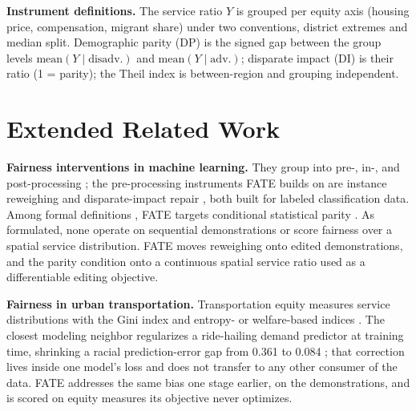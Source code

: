 \textbf{Instrument definitions.} The service ratio $Y$ is grouped
per equity axis (housing price, compensation, migrant share) under two
conventions, district extremes and median split. Demographic parity (DP) is
the signed gap between the group levels
$\mathrm{mean}(Y \mid \mathrm{disadv.})$ and
$\mathrm{mean}(Y \mid \mathrm{adv.})$; disparate impact (DI) is their ratio
(1 = parity); the Theil index is between-region and grouping independent.

\section{Extended Related Work}\label{app:related}

\textbf{Fairness interventions in machine learning.} They group into
pre-, in-, and post-processing \cite{barocas2023}; the pre-processing
instruments FATE builds on are instance reweighing \cite{kamirancalders2012}
and disparate-impact repair \cite{feldman2015}, both built for labeled
classification data. Among formal definitions \cite{vermarubin2018}, FATE
targets conditional statistical parity \cite{corbettdavies2017}. As
formulated, none operate on sequential demonstrations or score fairness
over a spatial service distribution. FATE moves reweighing onto edited
demonstrations, and the parity condition onto a continuous spatial service
ratio used as a differentiable editing objective.

\textbf{Fairness in urban transportation.} Transportation equity measures
service distributions with the Gini index
\cite{su2018taxigini,horchergraham2021,karner2024}
and entropy- or welfare-based indices \cite{theil1967,atkinson1970,demaio2007}.
The closest modeling neighbor regularizes a ride-hailing demand predictor at
training time, shrinking a racial prediction-error gap from 0.361 to 0.084
\cite{zheng2023};
that correction lives inside one model's loss and does not transfer to any
other consumer of the data. FATE addresses the same bias one stage earlier,
on the demonstrations, and is scored on equity measures its objective never
optimizes.

